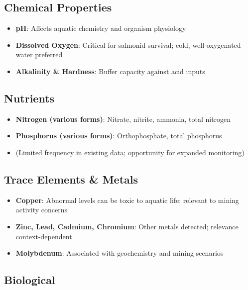 \documentclass[
  letterpaper,
]{scrbook}
\providecommand{\tightlist}{%
  \setlength{\itemsep}{0pt}\setlength{\parskip}{0pt}}\usepackage{longtable,booktabs,array}
\begin{document}
\subsection{Chemical Properties}\label{chemical-properties}

\begin{itemize}
\tightlist
\item
  \textbf{pH}: Affects aquatic chemistry and organism physiology
\item
  \textbf{Dissolved Oxygen}: Critical for salmonid survival; cold,
  well-oxygenated water preferred
\item
  \textbf{Alkalinity \& Hardness}: Buffer capacity against acid inputs
\end{itemize}

\subsection{Nutrients}\label{nutrients}

\begin{itemize}
\tightlist
\item
  \textbf{Nitrogen (various forms)}: Nitrate, nitrite, ammonia, total
  nitrogen
\item
  \textbf{Phosphorus (various forms)}: Orthophosphate, total phosphorus
\item
  (Limited frequency in existing data; opportunity for expanded
  monitoring)
\end{itemize}

\subsection{Trace Elements \& Metals}\label{trace-elements-metals}

\begin{itemize}
\tightlist
\item
  \textbf{Copper}: Abnormal levels can be toxic to aquatic life;
  relevant to mining activity concerns
\item
  \textbf{Zinc, Lead, Cadmium, Chromium}: Other metals detected;
  relevance context-dependent
\item
  \textbf{Molybdenum}: Associated with geochemistry and mining scenarios
\end{itemize}

\subsection{Biological}\label{biological}
\end{document}
